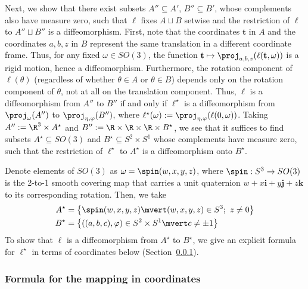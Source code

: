 Next, we show that there exist subsets $A'' \subseteq A'$, $B'' \subseteq B'$, whose complements also have measure zero, such that $\ell$ fixes $A \sqcup B$ setwise and the restriction of $\ell$ to $A'' \sqcup B''$ is a diffeomorphism.
First, note that the coordinates $\mathbf{t}$ in $A$ and the coordinates $a, b, z$ in $B$ represent the same translation in a different coordinate frame.
Thus, for any fixed $\omega \in SO(3)$, the function $\mathbf{t} \mapsto \proj_{a,b,z}(\ell(\mathbf{t}, \omega))$ is a rigid motion, hence a diffeomorphism.
Furthermore, the rotation component of $\ell(\theta)$ (regardless of whether $\theta \in A$ or $\theta \in B$) depends only on the rotation component of $\theta$, not at all on the translation component. 
Thus, $\ell$ is a diffeomorphism from $A''$ to $B''$ if and only if $\ell^\star$ is a diffeomorphism from $\proj_\omega(A'')$ to $\proj_{\eta,\varphi}(B'')$, where $\ell^\star(\omega) := \proj_{\eta,\varphi}(\ell(0, \omega))$.
Taking $A'' := \R^3 \times A^\star$ and $B'' := \R \times \R \times \R \times B^\star$, we see that it suffices to find subsets $A^\star \subseteq SO(3)$ and $B^\star \subseteq S^2 \times S^1$ whose complements have measure zero, such that the restriction of $\ell^\star$ to $A^\star$ is a diffeomorphism onto $B^\star$.

Denote elements of $SO(3)$ as $\omega = \spin(w, x, y, z)$, where $\spin: S^3 \to SO(3)$ is the 2-to-1 smooth covering map that carries a unit quaternion $w + x\mathbf{i} + y\mathbf{j} + z\mathbf{k}$ to its corresponding rotation.
Then, we take
\begin{align*}
    A^\star &= \left\{\spin(w, x, y, z) \mvert (w,x,y,z) \in S^3;\ z \neq 0 \right\} \\
    B^\star &= \left\{((a, b, c), \varphi) \in S^2 \times S^1 \mvert c \neq \pm 1 \right\}
\end{align*}
To show that $\ell$ is a diffeomorphism from $A^\star$ to $B^\star$, we give an explicit formula for $\ell^\star$ in terms of coordinates below (Section~\ref{sec:hopf_explicit_coords}).


\subsubsection{Formula for the mapping in coordinates}\label{sec:hopf_explicit_coords}

